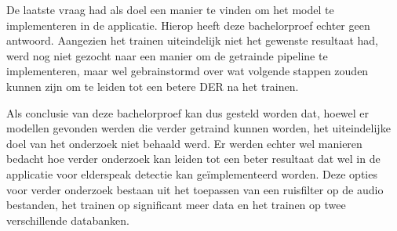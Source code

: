 De laatste vraag had als doel een manier te vinden om het model te implementeren in de applicatie. Hierop heeft deze bachelorproef echter geen antwoord. Aangezien het trainen uiteindelijk niet het gewenste resultaat had, werd nog niet gezocht naar een manier om de getrainde pipeline te implementeren, maar wel gebrainstormd over wat volgende stappen zouden kunnen zijn om te leiden tot een betere DER na het trainen.

Als conclusie van deze bachelorproef kan dus gesteld worden dat, hoewel er modellen gevonden werden die verder getraind kunnen worden, het uiteindelijke doel van het onderzoek niet behaald werd. Er werden echter wel manieren bedacht hoe verder onderzoek kan leiden tot een beter resultaat dat wel in de applicatie voor elderspeak detectie kan geïmplementeerd worden. Deze opties voor verder onderzoek bestaan uit het toepassen van een ruisfilter op de audio bestanden, het trainen op significant meer data en het trainen op twee verschillende databanken.